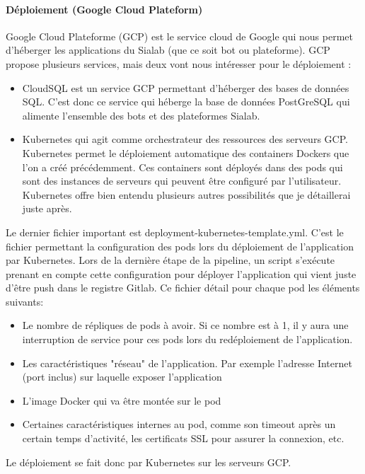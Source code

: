 \documentclass{article} %
\begin{document}
\paragraph{Déploiement (Google Cloud Plateform)\\}

Google Cloud Plateforme (GCP) est le service cloud de Google qui nous permet d'héberger les applications du Sialab (que ce soit bot ou plateforme). GCP propose plusieurs services, mais deux vont nous intéresser pour le déploiement : 
\begin{itemize}
 \item CloudSQL est un service GCP permettant d'héberger des bases de données SQL. C'est donc ce service qui héberge la base de données PostGreSQL qui alimente l'ensemble des bots et des plateformes Sialab.
 \item Kubernetes qui agit comme orchestrateur des ressources des serveurs GCP. Kubernetes permet le déploiement automatique des containers Dockers que l'on a créé précédemment. Ces containers sont déployés dans des pods qui sont des instances de serveurs qui peuvent être configuré par l'utilisateur. Kubernetes offre bien entendu plusieurs autres possibilités que je détaillerai juste après. 
\end{itemize}

Le dernier fichier important est deployment-kubernetes-template.yml. C'est le fichier permettant la configuration des pods lors du déploiement de l'application par Kubernetes. Lors de la dernière étape de la pipeline, un script s'exécute prenant en compte cette configuration pour déployer l'application qui vient juste d'être push dans le registre Gitlab. Ce fichier détail pour chaque pod les éléments suivants:
\begin{itemize}
 \item Le nombre de répliques de pods à avoir. Si ce nombre est à 1, il y aura une interruption de service pour ces pods lors du redéploiement de l'application.
 \item Les caractéristiques "réseau" de l'application. Par exemple l'adresse Internet (port inclus) sur laquelle exposer l'application
 \item L'image Docker qui va être montée sur le pod
 \item Certaines caractéristiques internes au pod, comme son timeout après un certain temps d'activité, les certificats SSL pour assurer la connexion, etc.
\end{itemize}

Le déploiement se fait donc par Kubernetes sur les serveurs GCP.\\
\end{document}
